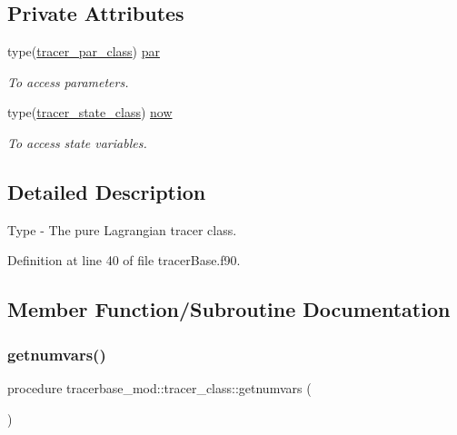 \subsection*{Private Attributes}
\begin{DoxyCompactItemize}
\item 
type(\mbox{\hyperlink{structtracerbase__mod_1_1tracer__par__class}{tracer\+\_\+par\+\_\+class}}) \mbox{\hyperlink{structtracerbase__mod_1_1tracer__class_aca04297200aad39fd04e31b630d9ca50}{par}}
\begin{DoxyCompactList}\small\item\em To access parameters. \end{DoxyCompactList}\item 
type(\mbox{\hyperlink{structtracerbase__mod_1_1tracer__state__class}{tracer\+\_\+state\+\_\+class}}) \mbox{\hyperlink{structtracerbase__mod_1_1tracer__class_ad1a1e2f727ad281e2562952d6ba94526}{now}}
\begin{DoxyCompactList}\small\item\em To access state variables. \end{DoxyCompactList}\end{DoxyCompactItemize}


\subsection{Detailed Description}
Type -\/ The pure Lagrangian tracer class. 

Definition at line 40 of file tracer\+Base.\+f90.



\subsection{Member Function/\+Subroutine Documentation}
\mbox{\label{structtracerbase__mod_1_1tracer__class_a5458a1e53360bfcdf51c9a677caab112}} 
\subsubsection{\texorpdfstring{getnumvars()}{getnumvars()}}
{\footnotesize\ttfamily procedure tracerbase\+\_\+mod\+::tracer\+\_\+class\+::getnumvars (\begin{DoxyParamCaption}{ }\end{DoxyParamCaption})\hspace{0.3cm}{\ttfamily [private]}}



